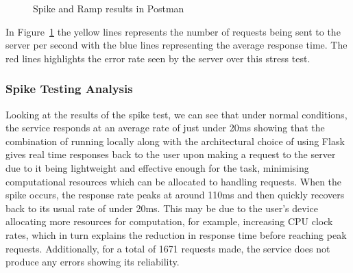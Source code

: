 \documentclass{surreydissertation}
\begin{document}
\begin{figure}[H]
    \centering
    \caption{Spike and Ramp results in Postman}
    \label{fig:results}
    \end{figure}

In Figure~\ref{fig:results} the yellow lines represents the number of requests being sent to the server per second with the blue lines representing the average response time. The red lines highlights the error rate seen by the server over this stress test.

\subsubsection{Spike Testing Analysis}
Looking at the results of the spike test, we can see that under normal conditions, the service responds at an average rate of just under 20ms showing that the combination of running locally along with the architectural choice of using Flask gives real time responses back to the user upon making a request to the server due to it being lightweight and effective enough for the task, minimising computational resources which can be allocated to handling requests. When the spike occurs, the response rate peaks at around 110ms and then quickly recovers back to its usual rate of under 20ms. This may be due to the user’s device allocating more resources for computation, for example, increasing CPU clock rates, which in turn explains the reduction in response time before reaching peak requests. Additionally, for a total of 1671 requests made, the service does not produce any errors showing its reliability.
\end{document}
